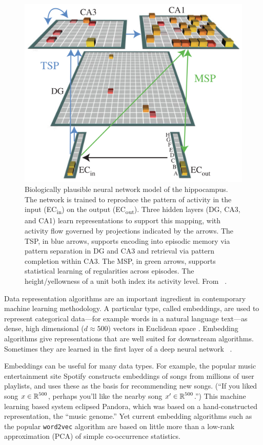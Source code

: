 \setlength{\columnsep}{20pt}
\begin{figure}
\centering
\includegraphics[width=.44\textwidth]{figs/hipp-model}
\caption{\small Biologically plausible neural network model of the
hippocampus. The network is trained to reproduce the pattern of
activity in the input (EC\textsubscript{in}) on the output
(EC\textsubscript{out}). Three hidden layers (DG, CA3, and CA1) learn
representations to support this mapping, with activity flow governed
by projections indicated by the arrows. The TSP, in blue
arrows, supports encoding into episodic memory via pattern separation
in DG and CA3 and retrieval via pattern completion within CA3. The
MSP, in green arrows, supports statistical learning of
regularities across episodes. The height/yellowness of a unit both
index its activity level. From ~\citet{Schapiro:2017}.}
    \label{fig:hipp}
    \vskip2pt
\end{figure}

\statbackground{}
Data representation algorithms are an important ingredient in contemporary
machine learning methodology. A particular type, called embeddings, are used to represent
categorical data---for example words in a natural language text---as
dense, high dimensional ($d\approx 500$) vectors in Euclidean space \citep{Mikolov:2013}.
Embedding algorithms give representations that are well suited for downstream
algorithms. Sometimes they are learned in the first layer of
a deep neural network ~\citep{Bengio:2003}.  

Embeddings can be useful for many data types. For example, the popular
music entertainment site Spotify constructs embeddings of songs from
millions of user playlists, and uses these as the basis for
recommending new songs.  (``If you liked song $x\in\mbox{$\mathbb{R}$}^{500}$,
perhaps you'll like the nearby song $x'\in\mbox{$\mathbb{R}$}^{500}$.'')  This
machine learning based system eclipsed Pandora, which was based on a
hand-constructed representation, the ``music genome.'' Yet current
embedding algorithms such as the popular \texttt{word2vec} algorithm
are based on little more than a low-rank approximation (PCA) of simple
co-occurrence statistics.


